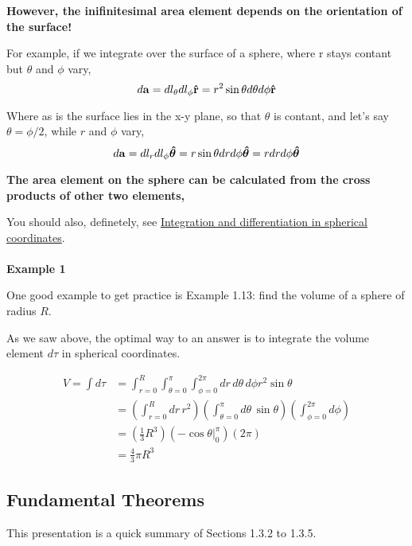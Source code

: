 \textbf{However, the inifinitesimal area element depends on the orientation of the surface!}

For example, if we integrate over the surface of a sphere, where r stays contant but $\theta$
and $\phi$ vary,
$$
d\boldsymbol{\mathbf{a}} = dl_\theta dl_\phi \boldsymbol{\mathbf{\hat{r}}} = r^2 \sin\theta d\theta d\phi \boldsymbol{\mathbf{\hat{r}}}
$$

Where as is the surface lies in the x-y plane, so that $\theta$ is contant, and let's say $\theta = \phi/2$,
while $r$ and $\phi$ vary,
$$
d\boldsymbol{\mathbf{a}} = dl_r dl_\phi \boldsymbol{\mathbf{\hat{\theta}}}
= r \sin\theta dr d\phi \boldsymbol{\mathbf{\hat{\theta}}}
= r dr d\phi \boldsymbol{\mathbf{\hat{\theta}}}
$$

\textbf{The area element on the sphere can be calculated from the cross products of other two elements,}

You should also, definetely, see
\href{https://en.wikipedia.org/wiki/Spherical_coordinate_system#Integration_and_differentiation_in_spherical_coordinates}{Integration and differentiation in spherical coordinates}.
\\~\\


\textbf{Example 1}

One good example to get practice is \cite{griffiths-em} Example 1.13: find the volume of a sphere of radius $R$.

As we saw above, the optimal way to an answer is to integrate the volume element $d\tau$ in spherical coordinates.

\begin{align*}
V = \int d\tau &=
\int_{r=0}^{R} \int_{\theta=0}^{\pi} \int_{\phi=0}^{2\pi} dr \, d\theta \, d\phi r^2 \sin\theta \\
&=  \left( \int_{r=0}^{R} dr \,r^2 \right)
    \left( \int_{\theta=0}^{\pi} d\theta \, \sin\theta \right)
    \left( \int_{\phi=0}^{2\pi} d\phi \right) \\
&= \left( \frac{1}{3} R^3 \right) \left( -\cos\theta \Big|_{0}^{\pi} \right) \left( 2\pi \right) \\
&= \frac{4}{3} \pi R^3
\end{align*}



\subsection{Fundamental Theorems} \label{section:funamental-theorems}

This presentation is a quick summary of \cite{griffiths-em} Sections 1.3.2 to 1.3.5.

